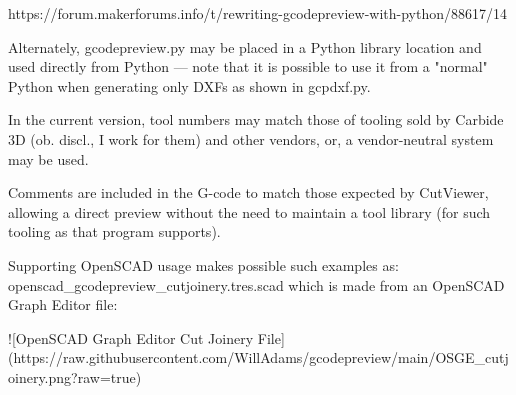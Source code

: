 \documentclass{ltxdoc}
\begin{document}
\begin{readme}
https://forum.makerforums.info/t/rewriting-gcodepreview-with-python/88617/14

Alternately, gcodepreview.py may be placed in a Python library location and used directly from Python --- note that it is possible to use it from a "normal" Python when generating only DXFs as shown in gcpdxf.py.

In the current version, tool numbers may match those of tooling sold by Carbide 3D (ob. discl., I work for them) and other vendors, or, a vendor-neutral system may be used. 

Comments are included in the G-code to match those expected by CutViewer, allowing a direct preview without the need to maintain a tool library (for such tooling as that program supports).

Supporting OpenSCAD usage makes possible such examples as: openscad_gcodepreview_cutjoinery.tres.scad which is made from an OpenSCAD Graph Editor file:

![OpenSCAD Graph Editor Cut Joinery File](https://raw.githubusercontent.com/WillAdams/gcodepreview/main/OSGE_cutjoinery.png?raw=true)


\end{readme}
\end{document}
